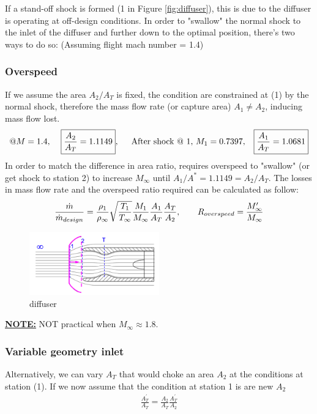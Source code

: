 \documentclass[a4paper,10pt]{article}
\begin{document}
If a stand-off shock is formed (1 in Figure \ref{fig:diffuser}), this is due to the diffuser is operating at off-design conditions. In order to "swallow" the normal shock to the inlet of the diffuser and further down to the optimal position, there's two ways to do so: (Assuming flight mach number = 1.4)

\subsubsection{Overspeed}
If we assume the area $A_2/A_T$ is fixed, the condition are constrained at (1) by the normal shock, therefore the mass flow rate (or capture area) $A_1\neq A_2$, inducing mass flow lost. 
\begin{gather*}
    @M=1.4,\hspace*{0.4cm}\boxed{\frac{A_2}{A_T} = 1.1149},\hspace*{0.5cm}\text{After shock @ 1, }M_1=0.7397,\hspace*{0.3cm}\boxed{\frac{A_1}{A_T} = 1.0681}
\end{gather*}
In order to match the difference in area ratio, requires overspeed to "swallow" (or get shock to station 2) to increase $M_\infty$ until $A_1/A^* = 1.1149=A_2/A_T$. The losses in mass flow rate and the overspeed ratio required can be calculated as follow:
\begin{gather*}
    \frac{\dot{m}}{\dot{m}_{design}} = \frac{\rho_1}{\rho_\infty}\sqrt{\frac{T_1}{T_\infty}}\frac{M_1}{M_\infty}\frac{A_1}{A_T}\frac{A_T}{A_2},\hspace*{0.7cm}R_{overspeed} = \frac{M_\infty^{\prime}}{M_\infty}
\end{gather*}
\begin{figure}[H]
    \centering
    \includegraphics[width=0.5\textwidth]{Figure/diffuser.png}
    \caption{diffuser}
\end{figure}
\vspace*{-0.3cm}
\underline{\textbf{NOTE:}} NOT practical when $M_\infty\approx1.8$.

\subsubsection{Variable geometry inlet}
Alternatively, we can vary $A_T$ that would choke an area $A_2$ at the conditions at station (1). If we now assume that the condition at station 1 is are new $A_2$
\begin{gather*}
    \frac{A_T^{\prime}}{A_T} = \frac{A_2}{A_T}\frac{A_T^{\prime}}{A_2}
\end{gather*}
\end{document}
